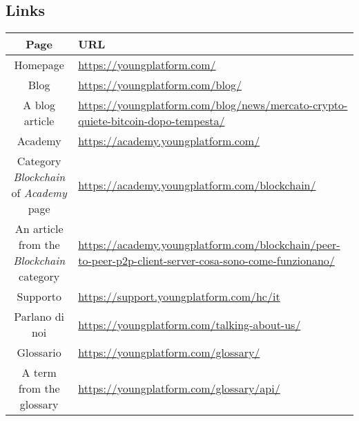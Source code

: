 \subsection{Links}

\begin{center}
  \begin{longtable}{|c|p{10.0cm}|}
    \hline
    \textbf{Page} & \textbf{URL} \\
    \hline
    Homepage & \href{https://youngplatform.com/}{https://youngplatform.com/} \\
    \hline
    Blog & \href{https://youngplatform.com/blog/}{https://youngplatform.com/blog/} \\
    \hline
    A blog article & \href{https://youngplatform.com/blog/news/mercato-crypto-quiete-bitcoin-dopo-tempesta/}{https://youngplatform.com/blog/news/mercato-crypto-quiete-bitcoin-dopo-tempesta/} \\
    \hline
    Academy & \href{https://academy.youngplatform.com/}{https://academy.youngplatform.com/} \\
    \hline
    Category \textit{Blockchain} of \textit{Academy} page & \href{https://academy.youngplatform.com/blockchain/}{https://academy.youngplatform.com/blockchain/} \\
    \hline
    An article from the \textit{Blockchain} category & \href{https://academy.youngplatform.com/blockchain/peer-to-peer-p2p-client-server-cosa-sono-come-funzionano/}{https://academy.youngplatform.com/blockchain/peer-to-peer-p2p-client-server-cosa-sono-come-funzionano/} \\
    \hline
    Supporto & \href{https://support.youngplatform.com/hc/it}{https://support.youngplatform.com/hc/it} \\
    \hline
    Parlano di noi &  \href{https://youngplatform.com/talking-about-us/}{https://youngplatform.com/talking-about-us/} \\
    \hline
    Glossario & \href{https://youngplatform.com/glossary/}{https://youngplatform.com/glossary/} \\
    \hline
    A term from the glossary & \href{https://youngplatform.com/glossary/api/}{https://youngplatform.com/glossary/api/} \\
    \hline
  \end{longtable}
\end{center}